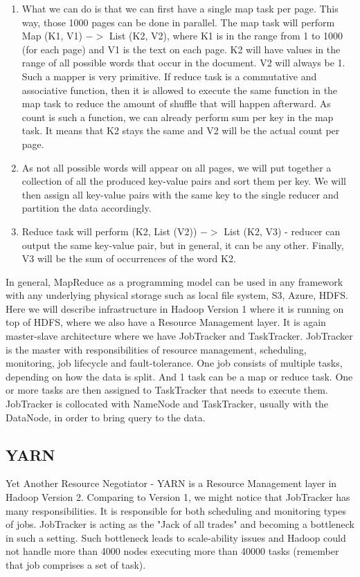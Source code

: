 \begin{enumerate}
	\item What we can do is that we can first have a single map task per page. This way, those 1000 pages can be done in parallel. The map task will perform Map (K1, V1) $->$ List (K2, V2), where K1 is in the range from 1 to 1000 (for each page) and V1 is the text on each page. K2 will have values in the range of all possible words that occur in the document. V2 will always be 1. Such a mapper is very primitive. If reduce task is a commutative and associative function, then it is allowed to execute the same function in the map task to reduce the amount of shuffle that will happen afterward. As count is such a function, we can already perform sum per key in the map task. It means that K2 stays the same and V2 will be the actual count per page.
	\item As not all possible words will appear on all pages, we will put together a collection of all the produced key-value pairs and sort them per key. We will then assign all key-value pairs with the same key to the single reducer and partition the data accordingly.
	\item Reduce task will perform (K2, List (V2)) $->$ List (K2, V3) - reducer can output the same key-value pair, but in general, it can be any other. Finally, V3 will be the sum of occurrences of the word K2.
\end{enumerate}
   
In general, MapReduce as a programming model can be used in any framework with any underlying physical storage such as local file system, S3, Azure, HDFS. Here we will describe infrastructure in Hadoop Version 1 where it is running on top of HDFS, where we also have a Resource Management layer. It is again master-slave architecture where we have JobTracker and TaskTracker. JobTracker is the master with responsibilities of resource management, scheduling, monitoring, job lifecycle and fault-tolerance. One job consists of multiple tasks, depending on how the data is split. And 1 task can be a map or reduce task. One or more tasks are then assigned to TaskTracker that needs to execute them. JobTracker is collocated with NameNode and TaskTracker, usually with the DataNode, in order to bring query to the data. 

\subsection{YARN}
Yet Another Resource Negotiator -  YARN \cite{YARN} is a Resource Management layer in Hadoop Version 2. Comparing to Version 1, we might notice that JobTracker has many responsibilities. It is responsible for both scheduling and monitoring types of jobs. JobTracker is acting as the "Jack of all trades" and becoming a bottleneck in such a setting. Such bottleneck leads to scale-ability issues and Hadoop could not handle more than 4000 nodes executing more than 40000 tasks (remember that job comprises a set of task). 

